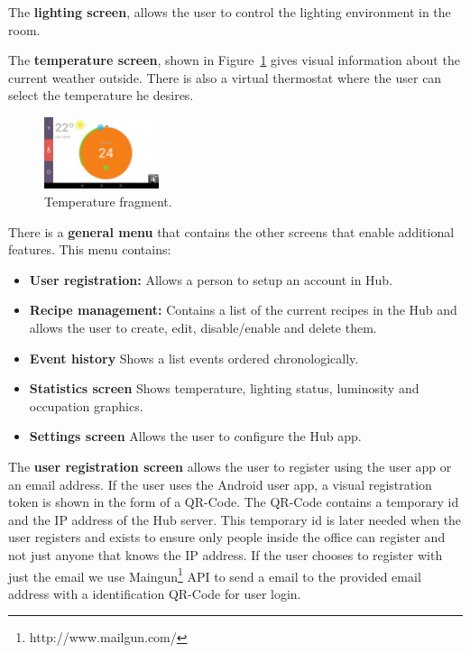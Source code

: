 \documentclass[conference]{IEEEtran}
\begin{document}
The \textbf{lighting screen}, allows the user to control the lighting environment in the room.

The \textbf{temperature screen}, shown in Figure~\ref{screen_temperature} gives visual information about the current weather outside. There is also a virtual thermostat where the user can select the temperature he desires. 


\begin{figure}[h]
\centering
\includegraphics[width=0.3\textwidth]{Figures/screen_temperature}
\caption{Temperature fragment.}
\label{screen_temperature}
\end{figure}


There is a \textbf{general menu} that contains the other screens that enable additional features. This menu contains:
\begin{itemize}
  \item \textbf{User registration:} Allows a person to setup an account in Hub.
  \item \textbf{Recipe management:} Contains a list of the current recipes in the Hub and allows the user to create, edit, disable/enable and delete them.
  
  \item \textbf{Event history} Shows a list events ordered chronologically.
  
  \item \textbf{Statistics screen} Shows temperature, lighting status, luminosity and occupation graphics.   
  
  \item \textbf{Settings screen} Allows the user to configure the Hub app.
\end{itemize}



The \textbf{user registration screen} allows the user to register using the user app or an email address.
If the user uses the Android user app, a visual registration token is shown in the form of a QR-Code. The QR-Code contains a temporary id and the IP address of the Hub server. This temporary id is later needed when the user registers and exists to ensure only people inside the office can register and not just anyone that knows the IP address. If the user chooses to register with just the email we use Maingun\footnote{http://www.mailgun.com/} API to send a email to the provided email address with a identification QR-Code for user login.
\end{document}
